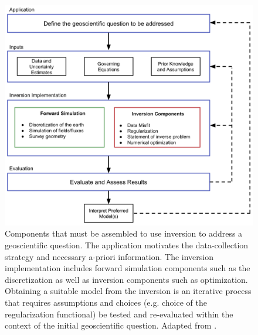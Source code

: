 \begin{figure}
    \begin{center}
    \includegraphics[width=0.8\columnwidth]{figures/InversionWorkflowBullets.png}
    \end{center}
\caption{
    Components that must be assembled to use inversion to address a geoscientific question.
    The application motivates the data-collection strategy and necessary a-priori information.
    The inversion implementation includes forward simulation components such as the discretization
    as well as inversion components such as optimization.
    Obtaining a suitable model from the inversion is an iterative process
    that requires assumptions and choices (e.g. choice of the regularization functional) be tested and re-evaluated within the context of the
    initial geoscientific question.
    Adapted from \cite{Cockett2015}.
}
\label{fig:InversionWorkflowBullets}
\end{figure}
